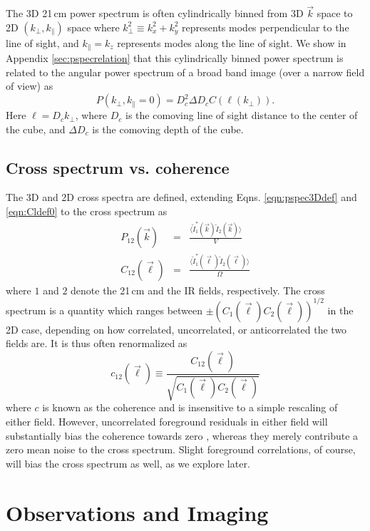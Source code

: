 \documentclass[numberedappendix]{emulateapj}
\begin{document}
The 3D 21\,cm power spectrum is often cylindrically binned from 3D $\vec{k}$ space to 2D $(k_\perp,k_\parallel)$ space where $k_\perp^2\equiv k_x^2+k_y^2$ represents modes perpendicular to the line of sight, and $k_\parallel=k_z$ represents modes along the line of sight. We show in Appendix \ref{sec:pspecrelation} that this cylindrically binned power spectrum is related to the angular power spectrum of a broad band image (over a narrow field of view) as
\begin{equation}
\label{eqn:convertP3toP2}
P(k_\perp,k_\parallel=0)=D_c^2 \Delta D_c C(\ell(k_\perp)).
\end{equation}
Here $\ell=D_c k_\perp$, where $D_c$ is the comoving line of sight distance to the center of the cube, and $\Delta D_c$ is the comoving depth of the cube.

\subsection{Cross spectrum vs. coherence}

The 3D and 2D cross spectra are defined, extending Eqns. \ref{eqn:pspec3Ddef} and \ref{eqn:Cldef0} to the cross spectrum as
\begin{eqnarray}
	P_{12}(\vec{k}) &=& \frac{\langle\tilde{I}_1^*(\vec{k})\tilde{I}_2(\vec{k})\rangle}{V}\\
	C_{12}(\vec{\ell}) &=& \frac{\langle \tilde{I}_1^*(\vec{\ell})\tilde{I}_2(\vec{\ell})\rangle}{\Omega}
\end{eqnarray}
where $1$ and $2$ denote the 21\,cm and the IR fields, respectively. The cross spectrum is a quantity which ranges between $\pm(C_{1}(\vec{\ell})C_{2}(\vec{\ell}))^{1/2}$ in the 2D case, depending on how correlated, uncorrelated, or anticorrelated the two fields are. It is thus often renormalized as  
\begin{equation}
\label{eqn:Cldefcross}
	c_{12}(\vec{\ell}) \equiv \frac{C_{12}(\vec{\ell}) }{\sqrt{C_1(\vec{\ell})  C_2(\vec{\ell}) }}
\end{equation}
where $c$ is known as the coherence and is insensitive to a simple rescaling of either field. However, uncorrelated foreground residuals in either field will substantially bias the coherence towards zero \citep{lidz09,furlanettolidz07}, whereas they merely contribute a zero mean noise to the cross spectrum. Slight foreground correlations, of course, will bias the cross spectrum as well, as we explore later. 

\section{Observations and Imaging}
\end{document}
